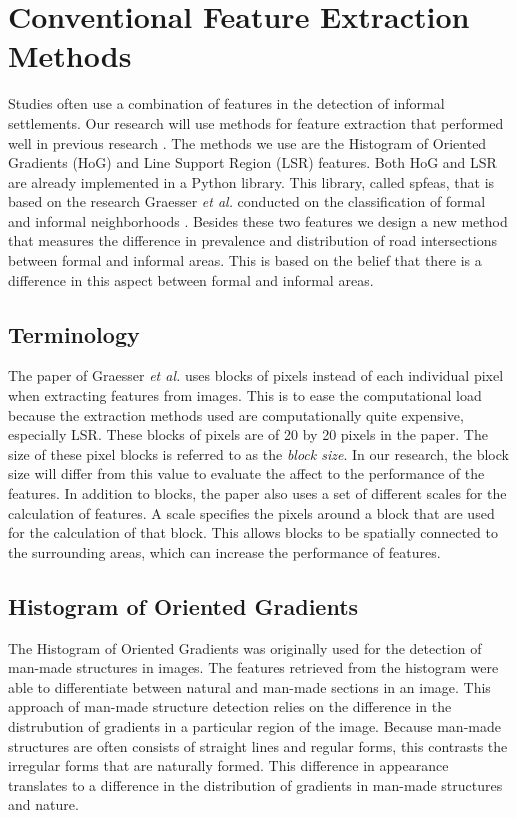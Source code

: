 \section{Conventional Feature Extraction Methods}
Studies often use a combination of features in the detection of informal settlements. Our research will use methods for feature extraction that performed well in previous research \cite{graesser2012image}. The methods we use are the Histogram of Oriented Gradients (HoG) and Line Support Region (LSR) features. Both HoG and LSR are already implemented in a Python library. This library, called spfeas, that is based on the research Graesser \textit{et al.} conducted on the classification of formal and informal neighborhoods \cite{graesser2012image}. Besides these two features we design a new method that measures the difference 
in prevalence and distribution of road intersections between formal and informal areas. This is based on the belief that there is a difference in this aspect between formal and informal areas.

\subsection{Terminology}
The paper of Graesser \textit{et al.} \cite{graesser2012image} uses blocks of pixels instead of each individual pixel when extracting features from images.  This is to ease the computational load because the extraction methods used are
computationally quite expensive, especially LSR. These blocks of pixels are of 20 by
20 pixels in the paper. The size of these pixel blocks is referred to as the \textit{block size}. In our research, the block size will differ from
this value to evaluate the affect to the performance of the features.
In addition to blocks, the paper also uses a set of different scales for the
calculation of features. A scale specifies the pixels around a block that
are used for the calculation of that block. This allows blocks to be
spatially connected to the surrounding areas, which can increase the
performance of features.

\subsection{Histogram of Oriented Gradients}


The Histogram of Oriented Gradients was originally used for the detection of
man-made structures in images. The features retrieved from the histogram were
able to differentiate between natural and man-made sections in an image. This
approach of man-made structure detection relies on the difference in the
distrubution of gradients in a particular region of the image. Because man-made
structures are often consists of straight lines and regular forms, this
contrasts the irregular forms that are naturally formed. This difference in
appearance translates to a difference in the distribution of gradients in
man-made structures and nature.


